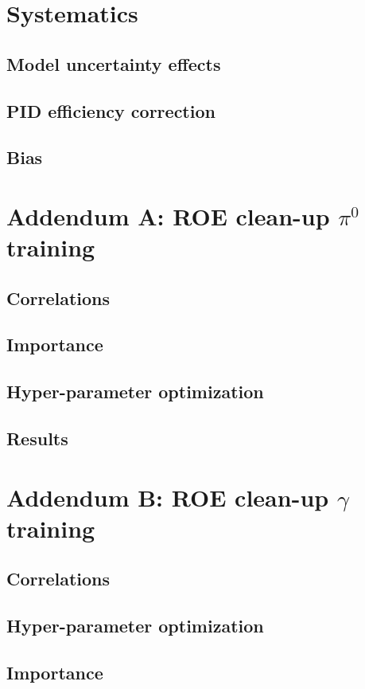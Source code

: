 \documentclass[headings=standardclasses,headings=big,oneside,a4paper,openany,12pt]{scrbook}
\begin{document}
\chapter{Systematics}
\section{Model uncertainty effects}
\section{PID efficiency correction}
\section{Bias}

\printbibliography

\chapter*{Addendum A: ROE clean-up $\pi^0$ training}
\section*{Correlations}
\section*{Importance}
\section*{Hyper-parameter optimization}
\section*{Results}

\chapter*{Addendum B: ROE clean-up $\gamma$ training}
\section*{Correlations}
\section*{Hyper-parameter optimization}
\section*{Importance}
\end{document}
